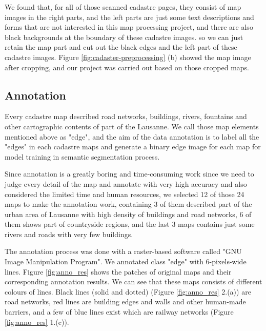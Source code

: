 \documentclass[12pt]{article}
\begin{document}
We found that, for all of those scanned cadastre pages, they consist of map images in the right parts, and the left parts are just some text descriptions and forms that are not interested in this map processing project, and there are also black backgrounds at the boundary of these cadastre images. so we can just retain the map part and cut out the black edges and the left part of these cadastre images. Figure \ref{fig:cadaster-preprocessing} (b) showed the map image after cropping, and our project was carried out based on those cropped maps. 
\subsection{Annotation}

Every cadastre map described road networks, buildings, rivers, fountains and other cartographic contents of part of the Lausanne. We call those map elements mentioned above as "edge", and the aim of the data annotation is to label all the "edges" in each cadastre maps and generate a binary edge image for each map for model training in semantic segmentation process.
 
Since annotation is a greatly boring and time-consuming work since we need to judge every detail of the map and annotate with very high accuracy and also considered the limited time and human resources, we selected 12 of those 24 maps to make the annotation work, containing 3 of them described part of the urban area of Lausanne with high density of buildings and road networks, 6 of them shows part of countryside regions, and the last 3 maps contains just some rivers and roads with very few buildings.

The annotation process was done with a raster-based software called "GNU Image Manipulation Program". We annotated class "edge" with 6-pixels-wide lines. Figure \ref{fig:anno_res} shows the patches of original maps and their corresponding annotation results. We can see that these maps consists of different colours of lines. Black lines (solid and dotted) (Figure \ref{fig:anno_res} 2.(a)) are road networks, red lines are building edges and walls and other human-made barriers, and a few of blue lines exist which are railway networks (Figure \ref{fig:anno_res} 1.(c)). 
\end{document}
